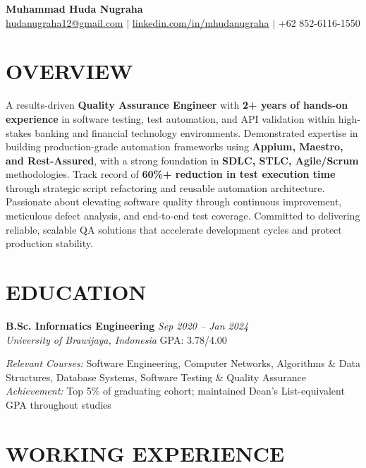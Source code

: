\documentclass[10pt,a4paper]{article}
\newcommand{\education}[4]{%
    \noindent\textbf{#1} \hfill \textit{#2}\\
    \textit{#3} \hfill #4\vspace{2pt}
}
\begin{document}
\begin{center}
    {\Huge\bfseries\color{primary} Muhammad Huda Nugraha}\\[3pt]
    \href{mailto:hudanugraha12@gmail.com}{hudanugraha12@gmail.com} $\mid$
    \href{https://www.linkedin.com/in/mhudanugraha}{linkedin.com/in/mhudanugraha} $\mid$
    +62 852-6116-1550
\end{center}

\vspace{-2pt}

\section*{OVERVIEW}
\vspace{-2pt}
A results-driven \textbf{Quality Assurance Engineer} with \textbf{2+ years of hands-on experience} in software testing, test automation, and API validation within high-stakes banking and financial technology environments. Demonstrated expertise in building production-grade automation frameworks using \textbf{Appium, Maestro, and Rest-Assured}, with a strong foundation in \textbf{SDLC, STLC, Agile/Scrum} methodologies. Track record of \textbf{60\%+ reduction in test execution time} through strategic script refactoring and reusable automation architecture. Passionate about elevating software quality through continuous improvement, meticulous defect analysis, and end-to-end test coverage. Committed to delivering reliable, scalable QA solutions that accelerate development cycles and protect production stability.

\vspace{2pt}

\section*{EDUCATION}

\education{B.Sc. Informatics Engineering}{Sep 2020 -- Jan 2024}{University of Brawijaya, Indonesia}{GPA: 3.78/4.00}

\textit{Relevant Courses:} Software Engineering, Computer Networks, Algorithms \& Data Structures, Database Systems, Software Testing \& Quality Assurance\\
\textit{Achievement:} Top 5\% of graduating cohort; maintained Dean's List-equivalent GPA throughout studies

\vspace{2pt}

\section*{WORKING EXPERIENCE}
\end{document}
